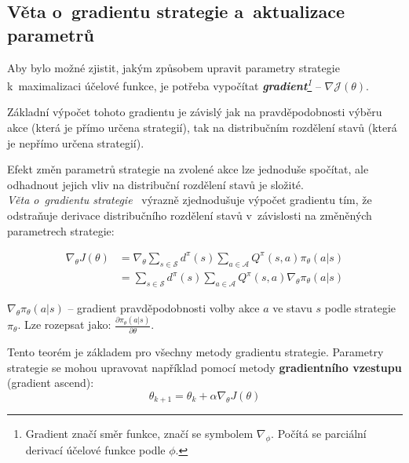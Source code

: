 \pagebreak

\subsection{Věta o~gradientu strategie a~aktualizace parametrů}
Aby bylo možné zjistit, jakým způsobem upravit parametry strategie k~maximalizaci účelové funkce, je potřeba vypočítat \emph{\textbf{gradient}\footnote[2]{Gradient značí směr funkce, značí se symbolem $\nabla_{\phi}$. Počítá se parciální derivací účelové funkce podle $\phi$.}} -- $\nabla \mathcal{J}(\theta)$.

Základní výpočet tohoto gradientu je závislý jak na pravděpodobnosti výběru akce (která je přímo určena strategií), tak na distribučním rozdělení stavů (která je nepřímo určena strategií).

Efekt změn parametrů strategie na zvolené akce lze jednoduše spočítat, ale odhadnout jejich vliv na distribuční rozdělení stavů je složité.\\
\emph{Věta o~gradientu strategie}~\cite{NIPS1999_464d828b} výrazně zjednodušuje výpočet gradientu tím, že odstraňuje derivace distribučního rozdělení stavů v~závislosti na změněných parametrech strategie:

\begin{equation}
    \label{eq:veta_o_gradientu_strategie}
    \begin{split}
        \nabla_\theta J(\theta) 
        &= \nabla_\theta \sum_{s \in \mathcal{S}} d^\pi(s) \sum_{a \in \mathcal{A}} Q^\pi(s, a) \pi_\theta(a \vert s) \\
        &= \sum_{s \in \mathcal{S}} d^\pi(s) \sum_{a \in \mathcal{A}} Q^\pi(s, a) \nabla_\theta \pi_\theta(a \vert s) 
    \end{split}
\end{equation}

\begin{myitemize}
  \item $\nabla_\theta \pi_\theta(a \vert s)$ -- gradient pravděpodobnosti volby akce $a$ ve stavu $s$ podle strategie $\pi_\theta$.
  Lze rozepsat jako: $\frac{\partial \pi_\theta(a \vert s)}{\partial \theta}$.
\end{myitemize}

Tento teorém je základem pro všechny metody gradientu strategie.
Parametry strategie se mohou upravovat například pomocí metody \textbf{gradientního  vzestupu} (gradient ascend):
\begin{equation}
  \theta_{k+1} = \theta_k + \alpha \nabla_\theta J(\theta)
\end{equation}


